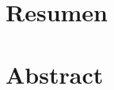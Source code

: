 \documentclass[../../../Tesis_JALS_Maestria.tex]{subfiles}
\begin{document}
	\chapter*{Resumen} 
	\lipsum[1-3]  
	
	
	
	
	
	\chapter*{Abstract} 
 	\lipsum[1-3]
	
	
	
	
	
\end{document}
